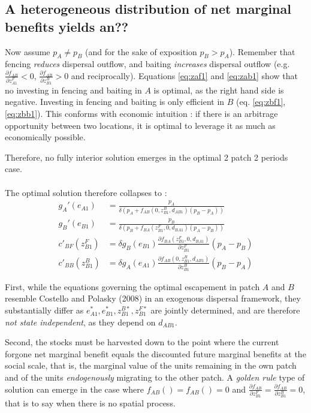 \documentclass{article}
\begin{document}
\subsection{A heterogeneous distribution of net marginal benefits yields an??}

Now assume $p_A \neq p_B$ (and for the sake of exposition $p_B > p_A$). Remember that fencing \textit{reduces} dispersal outflow, and baiting \textit{increases} dispersal outflow (e.g. $\frac{\partial f_{AB}}{\partial z_{A1}^F}<0$, $\frac{\partial f_{AB}}{\partial z_{B1}^B}>0$ and reciprocally). Equations \ref{eq:zaf1} and \ref{eq:zab1} show that no investing  in fencing and baiting in $A$ is optimal, as the right hand side is negative. Investing in fencing and baiting is only efficient in $B$ (eq. \ref{eq:zbf1}, \ref{eq:zbb1}). This conforms with economic intuition : if there is an arbitrage opportunity between two locations, it is optimal to leverage it as much as economically possible.

Therefore, no fully interior solution emerges in the optimal 2 patch 2 periods case. \\\\

The optimal solution therefore collapses to : 
\begin{align*}
g_A'(e_{A1}) &= \frac{p_A}{\delta \left(p_A + f_{AB}(0, z_{B1}^B, d_{AB1})(p_B-p_A)\right)} \\
%
g_B'(e_{B1}) &= \frac{p_B}{\delta \left( p_B + f_{BA}(z_{B1}^F, 0, d_{BA1})(p_A-p_B)\right)} \\
%
c'_{BF}(z_{B1}^F) &= \delta g_B(e_{B1}) \frac{\partial f_{BA}(z_{B1}^F, 0, d_{BA1})}{\partial z_{B1}^F}(p_A - p_B)\\
%
c'_{BB}(z_{B1}^B) & = \delta g_A(e_{A1}) \frac{\partial f_{AB}(0, z_{B1}^B, d_{AB1})}{\partial z_{B1}^B}(p_{B} - p_{A})
\end{align*}

First, while the equations governing the optimal escapement in patch $A$ and $B$ resemble Costello and Polasky (2008) in an exogenous dispersal framework, they substantially differ as $e_{A1}^*, e_{B1}^*, z_{B1}^{B*}, z_{B1}^{F*}$ are jointly determined, and are therefore \textit{not state independent}, as they depend on $d_{AB1}$.

Second, the stocks must be harvested down to the point where the current forgone net marginal benefit equals the discounted future marginal benefits at the social scale, that is, the marginal value of the units remaining in the own patch and of the units \textit{endogenously} migrating to the other patch. A \textit{golden rule} type of solution can emerge in the case where $f_{AB}()= f_{AB}()=0$ and $\frac{\partial f_{AB}}{\partial z_{B1}^F} = \frac{\partial f_{AB}}{\partial z_{B1}^B}=0$, that is to say when there is no spatial process.
\end{document}
